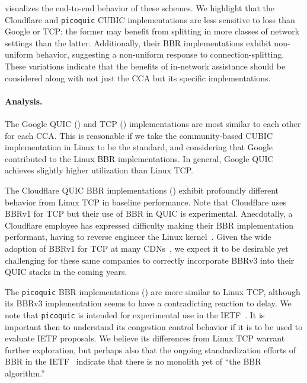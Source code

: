  visualizes the end-to-end behavior of these schemes.
We highlight that the Cloudflare and \texttt
 {picoquic} CUBIC implementations are less sensitive to loss than Google or
 TCP; the former may benefit from splitting in more classes of network settings
 than the latter. Additionally, their BBR implementations exhibit non-uniform
 behavior, suggesting a non-uniform response to
 connection-splitting. These variations indicate that the benefits of
 in-network assistance should be considered along with not just the CCA but its
 specific implementations.

\paragraph{Analysis.}

The Google QUIC ()
and TCP ()
implementations are most similar to each other for each CCA.
This is reasonable if we take the community-based CUBIC implementation in
Linux to be the standard, and considering that Google contributed to the Linux
BBR implementations. In general, Google QUIC achieves slightly higher
utilization than Linux TCP.

The Cloudflare QUIC BBR implementations ()
exhibit profoundly different behavior from Linux TCP in baseline performance.
Note that Cloudflare uses BBRv1 for TCP but their use of BBR in QUIC
is experimental. Anecdotally, a
Cloudflare employee has expressed difficulty making
their BBR implementation performant, having to reverse engineer
the Linux kernel~\cite{cardwell2024bbrv3-ietf119-qna}. Given the wide adoption
of BBRv1 for TCP at many CDNs~\cite{ware2024ccanalyzer}, we expect it to
be desirable yet challenging for these same companies to correctly incorporate
BBRv3 into their QUIC stacks in the coming years.

The \texttt{picoquic} BBR implementations ()
are more similar to Linux TCP, although its BBRv3 implementation seems to have
a contradicting reaction to delay.
We note that \texttt{picoquic} is intended for experimental use in the
IETF~\cite{picoquic}. It is important then to understand its congestion control
behavior if it is to be used to evaluate
IETF proposals. We believe its differences from Linux TCP warrant further
exploration, but perhaps also that the ongoing standardization efforts of BBR
in the IETF~\cite{cardwell2024bbr-ietf-draft} indicate
that there is no monolith yet of ``the BBR algorithm.''

